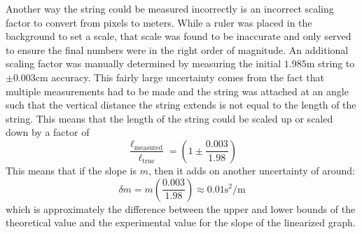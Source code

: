 \documentclass[%
 reprint,
 amsmath,amssymb
 aps,
]{revtex4-2}
\begin{document}
Another way the string could be measured incorrectly is an incorrect scaling factor to convert from pixels to meters. While a ruler was placed in the background to set a scale, that scale was found to be inaccurate and only served to ensure the final numbers were in the right order of magnitude. An additional scaling factor was manually determined by measuring the initial $1.985\si{\meter}$ string to $\pm 0.003\si{\centi\meter}$ accuracy. This fairly large uncertainty comes from the fact that multiple measurements had to be made and the string was attached at an angle such that the vertical distance the string extends is not equal to the length of the string. This means that the length of the string could be scaled up or scaled down by a factor of 
\begin{equation}
    \frac{\ell_\text{measured}}{\ell_\text{true}} = \left(1 \pm \frac{0.003}{1.98}\right)
    \label{eq:}
\end{equation}
This means that if the slope is $m$, then it adds on another uncertainty of around:
\begin{equation}
    \delta m = m\left(\frac{0.003}{1.98}\right) \approx 0.01 \si{\second\squared\per\meter}
    \label{eq:}
\end{equation}
which is approximately the difference between the upper and lower bounds of the theoretical value and the experimental value for the slope of the linearized graph.
\end{document}
